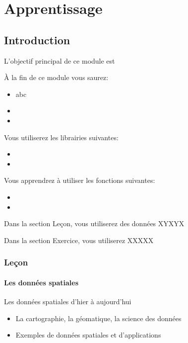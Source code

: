 \documentclass[
  12pt,
]{krantz}
\providecommand{\tightlist}{%
  \setlength{\itemsep}{0pt}\setlength{\parskip}{0pt}}
\begin{document}
\hypertarget{part-apprentissage}{%
\part{Apprentissage}\label{part-apprentissage}}

\hypertarget{intro}{%
\chapter{Introduction}\label{intro}}

L'objectif principal de ce module est

À la fin de ce module vous saurez:

\begin{itemize}
\item
  abc
\item
\item
\end{itemize}

Vous utiliserez les librairies suivantes:

\begin{itemize}
\item
\item
\end{itemize}

Vous apprendrez à utiliser les fonctions suivantes:

\begin{itemize}
\item
\item
\end{itemize}

Dans la section Leçon, vous utiliserez des données XYXYX

Dans la section Exercice, vous utiliserez XXXXX

\hypertarget{leuxe7on}{%
\section{Leçon}\label{leuxe7on}}

\hypertarget{les-donnuxe9es-spatiales}{%
\subsection{Les données spatiales}\label{les-donnuxe9es-spatiales}}

Les données spatiales d'hier à aujourd'hui

\begin{itemize}
\tightlist
\item
  La cartographie, la géomatique, la science des données
\item
  Exemples de données spatiales et d'applications
\end{itemize}
\end{document}
